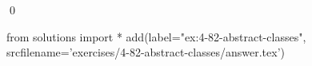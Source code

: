 
\begin{ex}
  \label{ex:4-82-abstract-classes}
  
  \qed
\end{ex}
\begin{python0}
from solutions import *
add(label="ex:4-82-abstract-classes",
    srcfilename='exercises/4-82-abstract-classes/answer.tex')
\end{python0}
